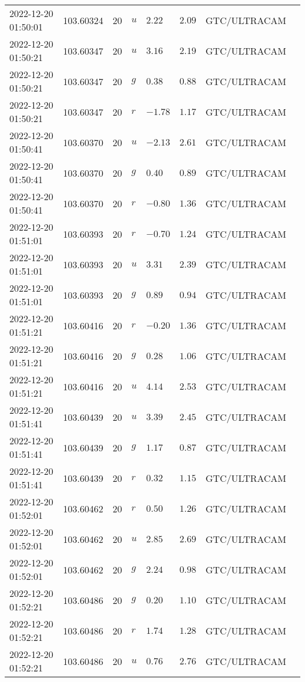 \documentclass{nature_plusfigure}
\begin{document}
\begin{supplement}
\begin{center}
\begin{longtable}{llllllll}
2022-12-20 01:50:01 & 103.60324 & 20 & $u$ & $2.22$ & $2.09$ & GTC/ULTRACAM &  \\ 
2022-12-20 01:50:21 & 103.60347 & 20 & $u$ & $3.16$ & $2.19$ & GTC/ULTRACAM &  \\ 
2022-12-20 01:50:21 & 103.60347 & 20 & $g$ & $0.38$ & $0.88$ & GTC/ULTRACAM &  \\ 
2022-12-20 01:50:21 & 103.60347 & 20 & $r$ & $-1.78$ & $1.17$ & GTC/ULTRACAM &  \\ 
2022-12-20 01:50:41 & 103.60370 & 20 & $u$ & $-2.13$ & $2.61$ & GTC/ULTRACAM &  \\ 
2022-12-20 01:50:41 & 103.60370 & 20 & $g$ & $0.40$ & $0.89$ & GTC/ULTRACAM &  \\ 
2022-12-20 01:50:41 & 103.60370 & 20 & $r$ & $-0.80$ & $1.36$ & GTC/ULTRACAM &  \\ 
2022-12-20 01:51:01 & 103.60393 & 20 & $r$ & $-0.70$ & $1.24$ & GTC/ULTRACAM &  \\ 
2022-12-20 01:51:01 & 103.60393 & 20 & $u$ & $3.31$ & $2.39$ & GTC/ULTRACAM &  \\ 
2022-12-20 01:51:01 & 103.60393 & 20 & $g$ & $0.89$ & $0.94$ & GTC/ULTRACAM &  \\ 
2022-12-20 01:51:21 & 103.60416 & 20 & $r$ & $-0.20$ & $1.36$ & GTC/ULTRACAM &  \\ 
2022-12-20 01:51:21 & 103.60416 & 20 & $g$ & $0.28$ & $1.06$ & GTC/ULTRACAM &  \\ 
2022-12-20 01:51:21 & 103.60416 & 20 & $u$ & $4.14$ & $2.53$ & GTC/ULTRACAM &  \\ 
2022-12-20 01:51:41 & 103.60439 & 20 & $u$ & $3.39$ & $2.45$ & GTC/ULTRACAM &  \\ 
2022-12-20 01:51:41 & 103.60439 & 20 & $g$ & $1.17$ & $0.87$ & GTC/ULTRACAM &  \\ 
2022-12-20 01:51:41 & 103.60439 & 20 & $r$ & $0.32$ & $1.15$ & GTC/ULTRACAM &  \\ 
2022-12-20 01:52:01 & 103.60462 & 20 & $r$ & $0.50$ & $1.26$ & GTC/ULTRACAM &  \\ 
2022-12-20 01:52:01 & 103.60462 & 20 & $u$ & $2.85$ & $2.69$ & GTC/ULTRACAM &  \\ 
2022-12-20 01:52:01 & 103.60462 & 20 & $g$ & $2.24$ & $0.98$ & GTC/ULTRACAM &  \\ 
2022-12-20 01:52:21 & 103.60486 & 20 & $g$ & $0.20$ & $1.10$ & GTC/ULTRACAM &  \\ 
2022-12-20 01:52:21 & 103.60486 & 20 & $r$ & $1.74$ & $1.28$ & GTC/ULTRACAM &  \\ 
2022-12-20 01:52:21 & 103.60486 & 20 & $u$ & $0.76$ & $2.76$ & GTC/ULTRACAM &  \\ 

\end{longtable}
\end{center}
\end{supplement}
\end{document}
